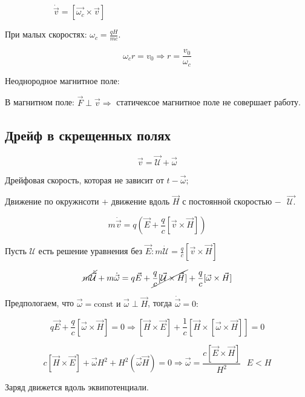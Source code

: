 \begin{figure}[h!]
\begin{subfigure}{0.45\textwidth}
        \caption*{\(\dot{\vec{v}}=[\vec{\omega_c}\times \vec{v}] \)}
        \label{fig:sub2}
    \end{subfigure}
    \caption*{}
    \label{fig:double}
\end{figure}

При малых скоростях:  $\omega_c= \frac{qH}{mc}.$

\[
\omega_c r=v_0 \Rightarrow r=\frac{v_0}{\omega_c} 
\]

\newpage

Неоднородное магнитное поле:


В магнитном поле: $\vec{F}\perp\vec{v}\Rightarrow$ статичексое магнитное поле не совершает работу. 

\subsection*{Дрейф в скрещенных полях}


\[
\vec{v}=\vec{\mathcal{U}}+\vec{\omega}
\]

Дрейфовая скорость, которая не зависит от $t -\vec{\omega}; $

Движение по окружнсоти + движение вдоль $\vec{H}$ с постоянной скоростью $ - \text{ }\vec{\mathcal{U} .}$

\[
m\dot{\vec{v}}=q\left( \vec{E}+\frac{q}{c}[\vec{v}\times \vec{H}]  \right)
\]

Пусть $\mathcal{U}$ есть решение уравнения без $\vec{E}: m\dot{\mathcal{U}}=\frac{q}{c}[\vec{v}\times\vec{H}]$

\[
\cancel{m\dot{\vec{\mathcal{U}}}}+m\dot{\vec{\omega}}=q\vec{E}+\cancel{\frac{q}{c}[\vec{\mathcal{U}}\times \vec{H}]}+\frac{q}{c}[\vec{\omega} \times \vec{H}] 
\]

Предпологаем, что $\vec{\omega}=\mathrm{const} \text{ и } \vec{\omega}\perp\vec{H}$, тогда $\dot{\vec{\omega}}=0:$

\[
q\vec{E}+\frac{q}{c}[\vec{\omega}\times \vec{H}]=0\Rightarrow[\vec{H}\times \vec{E}]+\frac{1}{c}[\vec{H}\times [\vec{\omega}\times \vec{H}]]=0  
\]

\[
c[\vec{H}\times \vec{E}]+\vec{\omega}H^2+H^2(\vec{\omega}\vec{H})=0\Rightarrow\boxed{\vec{\omega}=\frac{c[\vec{E}\times \vec{H}]}{H^2 }}\text{ } E<H
\]

Заряд движется вдоль эквипотенциали. 